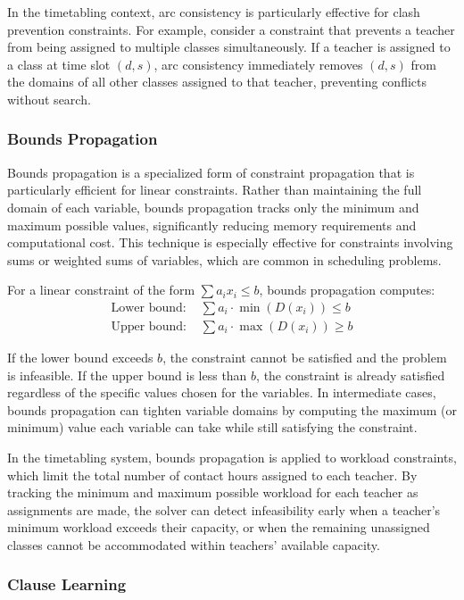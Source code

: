\documentclass[12pt,a4paper]{article}
\begin{document}
In the timetabling context, arc consistency is particularly effective for clash prevention constraints. For example, consider a constraint that prevents a teacher from being assigned to multiple classes simultaneously. If a teacher is assigned to a class at time slot $(d, s)$, arc consistency immediately removes $(d, s)$ from the domains of all other classes assigned to that teacher, preventing conflicts without search.

\subsubsection{Bounds Propagation}

Bounds propagation is a specialized form of constraint propagation that is particularly efficient for linear constraints. Rather than maintaining the full domain of each variable, bounds propagation tracks only the minimum and maximum possible values, significantly reducing memory requirements and computational cost. This technique is especially effective for constraints involving sums or weighted sums of variables, which are common in scheduling problems.

For a linear constraint of the form $\sum a_i x_i \leq b$, bounds propagation computes:
\begin{align}
\text{Lower bound: } & \sum a_i \cdot \min(D(x_i)) \leq b \\
\text{Upper bound: } & \sum a_i \cdot \max(D(x_i)) \geq b
\end{align}

If the lower bound exceeds $b$, the constraint cannot be satisfied and the problem is infeasible. If the upper bound is less than $b$, the constraint is already satisfied regardless of the specific values chosen for the variables. In intermediate cases, bounds propagation can tighten variable domains by computing the maximum (or minimum) value each variable can take while still satisfying the constraint.

In the timetabling system, bounds propagation is applied to workload constraints, which limit the total number of contact hours assigned to each teacher. By tracking the minimum and maximum possible workload for each teacher as assignments are made, the solver can detect infeasibility early when a teacher's minimum workload exceeds their capacity, or when the remaining unassigned classes cannot be accommodated within teachers' available capacity.

\subsubsection{Clause Learning}
\end{document}
